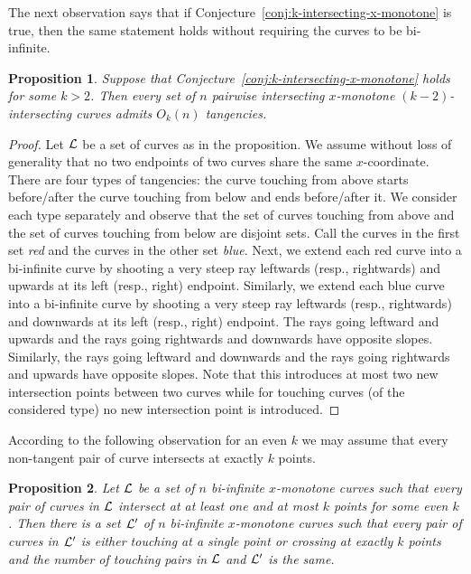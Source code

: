 \documentclass[11pt]{article}
\newtheorem{proposition}{Proposition}
\theoremstyle{definition}
\def\L{{\cal L}}
\begin{document}
The next observation says that if Conjecture~\ref{conj:k-intersecting-x-monotone} is true, then the same statement holds without requiring the curves to be bi-infinite.

\begin{proposition}
Suppose that Conjecture~\ref{conj:k-intersecting-x-monotone} holds for some $k>2$.
Then every set of $n$ pairwise intersecting $x$-monotone $(k-2)$-intersecting curves admits $O_k(n)$ tangencies.
\end{proposition}

\begin{proof}
Let $\L$ be a set of curves as in the proposition.
We assume without loss of generality that no two endpoints of two curves share the same $x$-coordinate.
There are four types of tangencies: the curve touching from above starts before/after the curve touching from below and ends before/after it.
We consider each type separately and observe that the set of curves touching from above and the set of curves touching from below are disjoint sets.
Call the curves in the first set \emph{red} and the curves in the other set \emph{blue}.
Next, we extend each red curve into a bi-infinite curve by shooting a very steep ray leftwards (resp., rightwards) and upwards at its left (resp., right) endpoint.
Similarly, we extend each blue curve into a bi-infinite curve by shooting a very steep ray leftwards (resp., rightwards) and downwards at its left (resp., right) endpoint.
The rays going leftward and upwards and the rays going rightwards and downwards have opposite slopes.
Similarly, the rays going leftward and downwards and the rays going rightwards and upwards have opposite slopes.
Note that this introduces at most two new intersection points between two curves while for touching curves (of the considered type) no new intersection point is introduced.
\end{proof}

According to the following observation for an even $k$ we may assume that every non-tangent pair of curve intersects at exactly $k$ points.

\begin{proposition}
Let $\L$ be a set of $n$ bi-infinite $x$-monotone curves such that every pair of curves in $\L$ intersect at at least one and at most $k$ points for some even $k$.
Then there is a set $\L'$ of $n$ bi-infinite $x$-monotone curves such that every pair of curves in $\L'$ is either touching at a single point or crossing at exactly $k$ points and the number of touching pairs in $\L$ and $\L'$ is the same.
\end{proposition}
\end{document}

